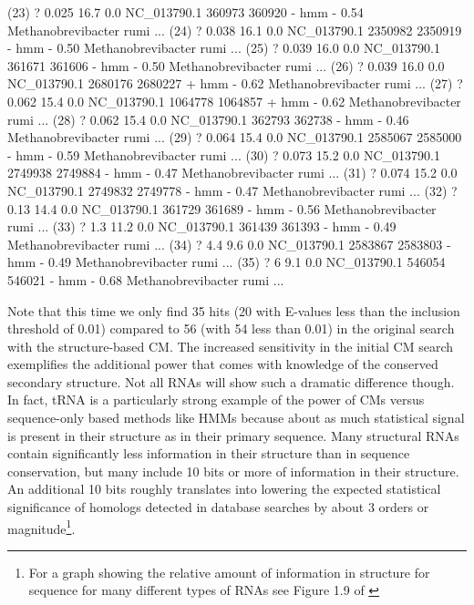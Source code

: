 \begin{sreoutput}
 (23) ?     0.025   16.7   0.0  NC_013790.1  360973  360920 - hmm     - 0.54  Methanobrevibacter rumi ...
 (24) ?     0.038   16.1   0.0  NC_013790.1 2350982 2350919 - hmm     - 0.50  Methanobrevibacter rumi ...
 (25) ?     0.039   16.0   0.0  NC_013790.1  361671  361606 - hmm     - 0.50  Methanobrevibacter rumi ...
 (26) ?     0.039   16.0   0.0  NC_013790.1 2680176 2680227 + hmm     - 0.62  Methanobrevibacter rumi ...
 (27) ?     0.062   15.4   0.0  NC_013790.1 1064778 1064857 + hmm     - 0.62  Methanobrevibacter rumi ...
 (28) ?     0.062   15.4   0.0  NC_013790.1  362793  362738 - hmm     - 0.46  Methanobrevibacter rumi ...
 (29) ?     0.064   15.4   0.0  NC_013790.1 2585067 2585000 - hmm     - 0.59  Methanobrevibacter rumi ...
 (30) ?     0.073   15.2   0.0  NC_013790.1 2749938 2749884 - hmm     - 0.47  Methanobrevibacter rumi ...
 (31) ?     0.074   15.2   0.0  NC_013790.1 2749832 2749778 - hmm     - 0.47  Methanobrevibacter rumi ...
 (32) ?      0.13   14.4   0.0  NC_013790.1  361729  361689 - hmm     - 0.56  Methanobrevibacter rumi ...
 (33) ?       1.3   11.2   0.0  NC_013790.1  361439  361393 - hmm     - 0.49  Methanobrevibacter rumi ...
 (34) ?       4.4    9.6   0.0  NC_013790.1 2583867 2583803 - hmm     - 0.49  Methanobrevibacter rumi ...
 (35) ?         6    9.1   0.0  NC_013790.1  546054  546021 - hmm     - 0.68  Methanobrevibacter rumi ...
\end{sreoutput}

Note that this time we only find 35 hits (20 with E-values less than
the inclusion threshold of 0.01) compared to 56 (with 54 less than
0.01) in the original search with the structure-based CM. The
increased sensitivity in the initial CM search exemplifies the
additional power that comes with knowledge of the conserved secondary
structure. Not all RNAs will show such a dramatic difference
though. In fact, tRNA is a particularly strong example of the power of
CMs versus sequence-only based methods like HMMs because about as much
statistical signal is present in their structure as in their primary
sequence. Many structural RNAs contain significantly less information
in their structure than in sequence conservation, but many include 10
bits or more of information in their structure. An additional 10 bits
roughly translates into lowering the expected statistical significance
of homologs detected in database searches by about 3 orders or
magnitude\footnote{For a graph showing the relative amount of
information in structure for sequence for many different types of RNAs
see Figure 1.9 of \citep{Nawrocki09}}.

